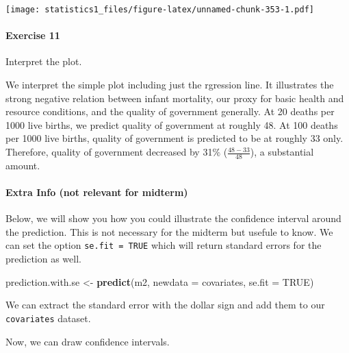 \documentclass[]{article}
\newenvironment{Shaded}{\begin{snugshade}}{\end{snugshade}}
\newcommand{\KeywordTok}[1]{\textcolor[rgb]{0.13,0.29,0.53}{\textbf{#1}}}
\newcommand{\DataTypeTok}[1]{\textcolor[rgb]{0.13,0.29,0.53}{#1}}
\newcommand{\StringTok}[1]{\textcolor[rgb]{0.31,0.60,0.02}{#1}}
\newcommand{\OtherTok}[1]{\textcolor[rgb]{0.56,0.35,0.01}{#1}}
\newcommand{\OperatorTok}[1]{\textcolor[rgb]{0.81,0.36,0.00}{\textbf{#1}}}
\newcommand{\NormalTok}[1]{#1}
\let\oldparagraph\paragraph
\renewcommand{\paragraph}[1]{\oldparagraph{#1}\mbox{}}
\theoremstyle{definition}
\theoremstyle{definition}
\theoremstyle{definition}
\theoremstyle{remark}
\begin{document}
\texttt{[image: statistics1\_files/figure-latex/unnamed-chunk-353-1.pdf]}

\paragraph{Exercise 11}\label{exercise-11-4}

Interpret the plot.

We interpret the simple plot including just the rgression line. It
illustrates the strong negative relation between infant mortality, our
proxy for basic health and resource conditions, and the quality of
government generally. At 20 deaths per 1000 live births, we predict
quality of government at roughly 48. At 100 deaths per 1000 live births,
quality of government is predicted to be at roughly 33 only. Therefore,
quality of government decreased by 31\(\%\) (\(\frac{48-33}{48}\)), a
substantial amount.

\paragraph{Extra Info (not relevant for
midterm)}\label{extra-info-not-relevant-for-midterm}

Below, we will show you how you could illustrate the confidence interval
around the prediction. This is not necessary for the midterm but usefule
to know. We can set the option \texttt{se.fit\ =\ TRUE} which will
return standard errors for the prediction as well.

\begin{Shaded}
\begin{Highlighting}[]
\NormalTok{prediction.with.se <-}\StringTok{ }\KeywordTok{predict}\NormalTok{(m2, }\DataTypeTok{newdata =}\NormalTok{ covariates, }\DataTypeTok{se.fit =} \OtherTok{TRUE}\NormalTok{)}
\end{Highlighting}
\end{Shaded}

We can extract the standard error with the dollar sign and add them to
our \texttt{covariates} dataset.

\begin{Shaded}
\end{Shaded}

Now, we can draw confidence intervals.
\end{document}
